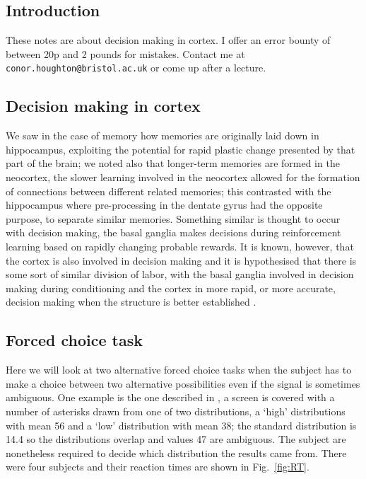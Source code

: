 \documentclass[11pt,a4paper]{scrartcl}
\begin{document}
\subsection*{Introduction}
These notes are about decision making in cortex. I offer an error bounty of
between 20p and 2 pounds for mistakes. Contact me at
\texttt{conor.houghton@bristol.ac.uk} or come up after a lecture.

\subsection*{Decision making in cortex}

We saw in the case of memory how memories are originally laid down in
hippocampus, exploiting the potential for rapid plastic change
presented by that part of the brain; we noted also that longer-term
memories are formed in the neocortex, the slower learning involved in
the neocortex allowed for the formation of connections between
different related memories; this contrasted with the hippocampus where
pre-processing in the dentate gyrus had the opposite purpose, to
separate similar memories. Something similar is thought to occur with
decision making, the basal ganglia makes decisions during
reinforcement learning based on rapidly changing probable rewards. It
is known, however, that the cortex is also involved in decision making
and it is hypothesised that there is some sort of similar division of
labor, with the basal ganglia involved in decision making during
conditioning and the cortex in more rapid, or more accurate, decision
making when the structure is better established
\cite{AshbyEnnisSpiering2007a}.

\subsection*{Forced choice task}

Here we will look at two alternative forced choice tasks when the
subject has to make a choice between two alternative possibilities
even if the signal is sometimes ambiguous. One example is the one
described in \cite{RatcliffVanZandtMcKoon1999a}, a screen is covered
with a number of asterisks drawn from one of two distributions, a
\lq{}high\rq{} distributions with mean 56 and a \lq{}low\rq{}
distribution with mean 38; the standard distribution is 14.4 so the
distributions overlap and values 47 are ambiguous. The subject are
nonetheless required to decide which distribution the results came
from. There were four subjects and their reaction times are shown in
Fig.~\ref{fig:RT}. 
\end{document}
